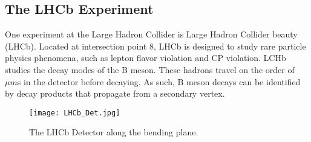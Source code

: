   \subsection{The LHCb Experiment}

    One experiment at the Large Hadron Collider is Large Hadron Collider beauty (LHCb).
    Located at intersection point 8, LHCb is designed to study rare particle physics phenomena, such as lepton flavor violation and CP violation. 
    LCHb studies the decay modes of the B meson.
    These hadrons travel on the order of $\mu m$s in the detector before decaying. 
    As such, B meson decays can be identified by decay products that propagate from a secondary vertex.

    \begin{figure}[h!]
      \centering
      \texttt{[image: LHCb\_Det.jpg]}
      \caption{The LHCb Detector along the bending plane.}
      \label{fig:LHCb_Collab}
    \end{figure}


